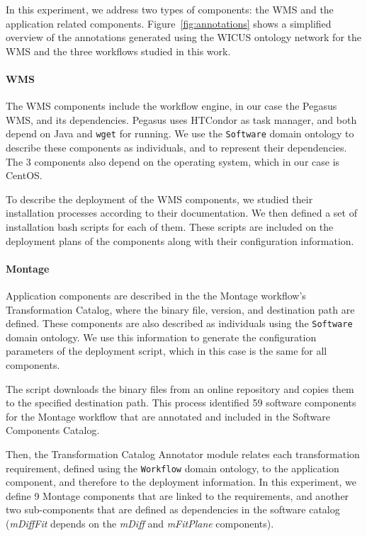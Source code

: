 In this experiment, we address two types of components: the WMS and the application related components. Figure~\ref{fig:annotations} shows a simplified overview of the annotations generated using the WICUS ontology network for the WMS and the three workflows studied in this work.


\paragraph{\textbf{WMS}}

 The WMS components include the workflow engine, in our case the Pegasus WMS, and its dependencies. Pegasus uses HTCondor as task manager, and both depend on Java and \texttt{wget} for running. We use the \texttt{Software} domain ontology to describe these components as individuals, and to represent their dependencies. The 3 components also depend on the operating system, which in our case is CentOS.

To describe the deployment of the WMS components, we studied their installation processes according to their documentation. We then defined a set of installation bash scripts for each of them. These scripts are included on the deployment plans of the components along with their configuration information.  
 
\paragraph{\textbf{Montage}}
 
Application components are described in the the Montage workflow's Transformation Catalog, where the binary file, version, and destination path are defined. These components are also described as individuals using the \texttt{Software} domain ontology. We use this information to generate the configuration parameters of the deployment script, which in this case is the same for all components. 

The script downloads the binary files from an online repository and copies them to the specified destination path. This process identified 59 software components for the Montage workflow that are annotated and included in the Software Components Catalog.

Then, the Transformation Catalog Annotator module relates each transformation requirement, defined using the \texttt{Workflow} domain ontology, to the application component, and therefore to the deployment information.
In this experiment, we define 9 Montage components that are linked to the requirements, and another two sub-components that are defined as dependencies in the software catalog (\emph{mDiffFit} depends on the \emph{mDiff} and \emph{mFitPlane} components).



